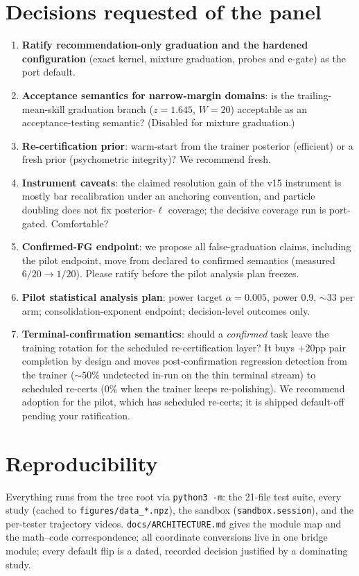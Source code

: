\documentclass[11pt]{article}
\begin{document}
\section{Decisions requested of the panel}
\label{sec:asks}
\begin{enumerate}
\item \textbf{Ratify recommendation-only graduation and the hardened
configuration} (exact kernel, mixture graduation, probes and e-gate) as the
port default.
\item \textbf{Acceptance semantics for narrow-margin domains}: is the
trailing-mean-skill graduation branch ($z = 1.645$, $W = 20$) acceptable as an
acceptance-testing semantic? (Disabled for mixture graduation.)
\item \textbf{Re-certification prior}: warm-start from the trainer posterior
(efficient) or a fresh prior (psychometric integrity)? We recommend fresh.
\item \textbf{Instrument caveats}: the claimed resolution gain of the v15
instrument is mostly bar recalibration under an anchoring convention, and
particle doubling does not fix posterior-$\ell$ coverage; the decisive coverage
run is port-gated. Comfortable?
\item \textbf{Confirmed-FG endpoint}: we propose all false-graduation claims,
including the pilot endpoint, move from declared to confirmed semantics
(measured $6/20 \to 1/20$). Please ratify before the pilot analysis plan
freezes.
\item \textbf{Pilot statistical analysis plan}: power target
$\alpha = 0.005$, power $0.9$, ${\sim}33$ per arm; consolidation-exponent
endpoint; decision-level outcomes only.
\item \textbf{Terminal-confirmation semantics}: should a \emph{confirmed} task
leave the training rotation for the scheduled re-certification layer? It buys
$+20$pp pair completion by design and moves post-confirmation regression
detection from the trainer (${\sim}50\%$ undetected in-run on the thin terminal
stream) to scheduled re-certs ($0\%$ when the trainer keeps re-polishing). We
recommend adoption for the pilot, which has scheduled re-certs; it is shipped
default-off pending your ratification.
\end{enumerate}

\section{Reproducibility}
Everything runs from the tree root via \texttt{python3 -m}: the 21-file test
suite, every study (cached to \texttt{figures/data\_*.npz}), the sandbox
(\texttt{sandbox.session}), and the per-tester trajectory videos.
\texttt{docs/ARCHITECTURE.md} gives the module map and the math--code
correspondence; all coordinate conversions live in one bridge module; every
default flip is a dated, recorded decision justified by a dominating study.
\end{document}
